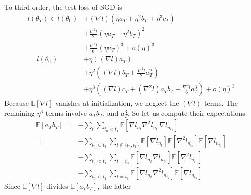 \documentclass{article}
\theoremstyle{plain}
\theoremstyle{definition}
\newcommand{\expct}[1]{\mathbb{E}\left[#1\right]}
\newcommand{\wrap}[1]{\left(#1\right)}
\begin{document}
\begin{shaded}
            To third order, the test loss of SGD is
            \begin{align*}
                l(\theta_T)
                \in
                        l(\theta_0)
                &+     (\nabla   l)   (\eta a_T + \eta^2 b_T + \eta^3 c_T)                              \\
                &+\frac{\nabla^2 l}{2}(\eta a_T + \eta^2 b_T             )^2                            \\
                &+\frac{\nabla^3 l}{6}(\eta a_T                          )^3 
                 +o(\eta)^3                                                                             \\
                =
                    l(\theta_0)
                &+  \eta       \wrap{(\nabla l) a_T                               }                     \\
                &+  \eta^2     \wrap{(\nabla l) b_T + \frac{\nabla^2 l}{2} a_T^2  }                     \\
                &+  \eta^3     \wrap{(\nabla l) c_T + (\nabla^2 l) a_T b_T + \frac{\nabla^3 l}{6} a_T^3}
                 +o(\eta)^3                                                                             
            \end{align*}
            Because $\expct{\nabla l}$ vanishes at initialization, we neglect
            the $(\nabla l)$ terms.  The remaining $\eta^3$ terms involve
            $a_T b_T$, and $a_T^3$.  So let us
            compute their expectations:
            \begin{align*}
                \expct{a_T b_T}
                    =&- \sum_{t} \sum_{t_0 < t_1}
                        \expct{\nabla l_{n_t} \nabla^2 l_{n_{t_1}} \nabla l_{n_{t_0}}}
                    \\
                    =&- \sum_{t_0 < t_1}  
                        \sum_{t \notin \{t_0, t_1\}} 
                            \expct{\nabla l_{n_t}} \expct{\nabla^2 l_{n_{t_1}}} \expct{\nabla l_{n_{t_0}}}
                    \\&- \sum_{t_0 < t_1}  
                        \sum_{t = t_0}
                            \expct{\nabla l_{n_t} \nabla l_{n_{t_0}}} \expct{\nabla^2 l_{n_{t_1}}}
                    \\&- \sum_{t_0 < t_1}  
                        \sum_{t = t_1}
                            \expct{\nabla l_{n_t} \nabla^2 l_{n_{t_1}}} \expct{\nabla l_{n_{t_0}}}
            \end{align*}
            Since $\expct{\nabla l}$ divides $\expct{a_T b_T}$, the latter

\end{shaded}
\end{document}
